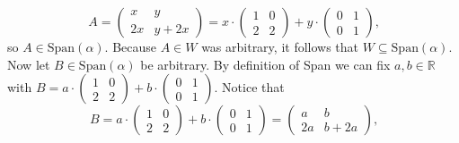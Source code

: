 \documentclass[12pt]{article}
\newenvironment{problem}[2][Problem]
{
	\begin{trivlist} 
		\item[\hskip \labelsep {\bfseries #1 #2:}]
	}
{
	\end{trivlist}
	}
\newenvironment{solution}[1][Solution]
{
	\begin{trivlist} 
		\item[\hskip \labelsep {\itshape #1:}]
	}
	{
	\end{trivlist}
}
\begin{document}
\begin{problem}{2}
\begin{solution}
\[
A = \begin{pmatrix} x&y\\2x&y+2x\end{pmatrix} = x\cdot\begin{pmatrix} 1&0\\2&2 \end{pmatrix} + y\cdot \begin{pmatrix} 0&1\\0&1 \end{pmatrix} \text{,}
\]
so $A \in \text{Span}(\alpha)$. Because $A \in W$ was arbitrary, it follows that $W \subseteq \text{Span}(\alpha)$. Now let $B \in \text{Span}(\alpha)$ be arbitrary. By definition of Span we can fix $a,b \in \mathbb{R}$ with $B= a\cdot\begin{pmatrix} 1&0\\2&2 \end{pmatrix} + b\cdot \begin{pmatrix} 0&1\\0&1 \end{pmatrix}$. Notice that
\[
B= a\cdot\begin{pmatrix} 1&0\\2&2 \end{pmatrix} + b\cdot \begin{pmatrix} 0&1\\0&1 \end{pmatrix} = \begin{pmatrix} a&b\\2a&b+2a\end{pmatrix} \text{,}
\]

\end{solution}
\end{problem}
\end{document}
